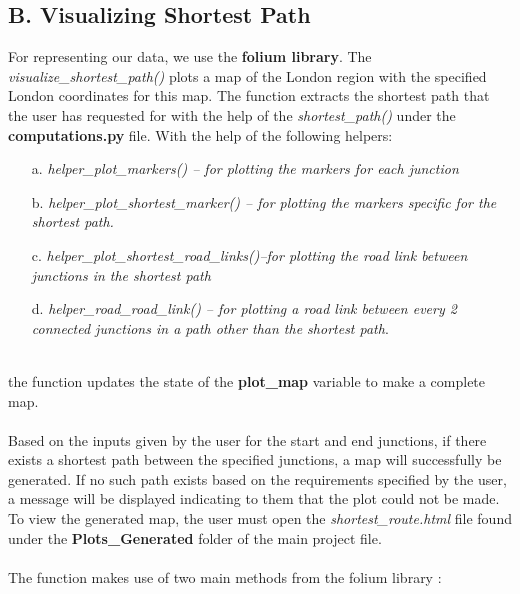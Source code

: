 \documentclass[fontsize=11pt]{IEEEtran}
\begin{document}
\begin{enumerate}
\subsection*{ B. Visualizing Shortest Path}
For representing our data, we use the \textbf{folium library}.
The \textit{visualize\_shortest\_path()} plots a map of the London region with the specified London coordinates for this map. The function extracts the shortest path that the user has requested for with the help of the \textit{shortest\_path()} under the \textbf{computations.py} file. \newpage
With the help of the following helpers: \begin{enumerate}
    \item[a.] \textit{helper\_plot\_markers() -- for plotting the markers for each junction} \\
    \item [b.] \textit{helper\_plot\_shortest\_marker() -- for plotting the markers specific for the shortest path.} \\
    \item[c.]
    \textit{helper\_plot\_shortest\_road\_links()--for plotting the road link between junctions in the shortest path} \\
    \item[d.]
    \textit{helper\_road\_road\_link() -- for plotting a road link between every 2 connected junctions in a path other than the shortest path}. \\
\end{enumerate} \\
the function updates the state of the \textbf{plot\_map} variable to make a complete map. \\ \\
Based on the inputs given by the user for the start and end junctions, if there exists a shortest path between the specified junctions, a map will successfully be generated. If no such path exists based on the requirements specified by the user, a message will be displayed indicating to them that the plot could not be made. \\
To view the generated map, the user must open the \textit{shortest\_route.html} file found under the \textbf{Plots\_Generated} folder of the main project file.
 \\ \\
 The function makes use of two main methods from the folium library :


\end{enumerate}
\end{document}
